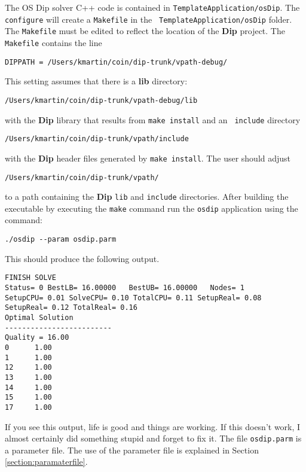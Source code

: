 \documentclass[11pt]{article}
\begin{document}
The OS Dip solver C++ code is contained in {\tt TemplateApplication/osDip}.
 The {\tt configure}  will create a {\tt Makefile}  in the {\tt
 TemplateApplication/osDip} folder. The {\tt Makefile} must be edited to reflect
 the location of the {\bf Dip} project. The {\tt Makefile} contains the
 line

\begin{verbatim}
DIPPATH = /Users/kmartin/coin/dip-trunk/vpath-debug/
\end{verbatim}

This setting assumes that there is a {\bf lib} directory:

\begin{verbatim}
/Users/kmartin/coin/dip-trunk/vpath-debug/lib
\end{verbatim}
with the {\bf Dip} library that results from {\tt make install} and an {\tt
include} directory
\begin{verbatim}
/Users/kmartin/coin/dip-trunk/vpath/include
\end{verbatim}
with the {\bf Dip} header files generated by {\tt make install}.  The user
should adjust
\begin{verbatim}
/Users/kmartin/coin/dip-trunk/vpath/
\end{verbatim}
to a path containing the {\bf Dip} {\tt lib} and {\tt include} directories. 
After building the executable by executing the {\tt make} command run the {\tt osdip} application using the command:

\begin{verbatim}
./osdip --param osdip.parm
\end{verbatim}

This should produce the following output.


\begin{verbatim}
FINISH SOLVE
Status= 0 BestLB= 16.00000   BestUB= 16.00000   Nodes= 1      
SetupCPU= 0.01 SolveCPU= 0.10 TotalCPU= 0.11 SetupReal= 0.08 
SetupReal= 0.12 TotalReal= 0.16
Optimal Solution
-------------------------
Quality = 16.00
0      1.00
1      1.00
12     1.00
13     1.00
14     1.00
15     1.00
17     1.00

\end{verbatim}

If you see this output, life is good and things are working. If this doesn't
work, I almost certainly did something stupid and forget to fix it.  The file
{\tt osdip.parm} is a parameter file. The use of the parameter file is 
explained in Section \ref{section:paramaterfile}.
\end{document}
